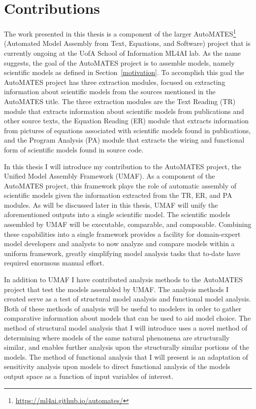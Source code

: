 \section{Contributions\label{sec:contributions}}
The work presented in this thesis is a component of the larger AutoMATES\footnote{\url{https://ml4ai.github.io/automates/}} (Automated Model Assembly from Text, Equations, and Software) project \citep{pyarelal2019} that is currently ongoing at the UofA School of Information ML4AI lab.
As the name suggests, the goal of the AutoMATES project is to assemble models, namely scientific models as defined in Section~\ref{motivation}.
To accomplish this goal the AutoMATES project has three extraction modules, focused on extracting information about scientific models from the sources mentioned in the AutoMATES title.
The three extraction modules are the Text Reading (TR) module that extracts information about scientific models from publications and other source texts, the Equation Reading (ER) module that extracts information from pictures of equations associated with scientific models found in publications, and the Program Analysis (PA) module that extracts the wiring and functional form of scientific models found in source code.

In this thesis I will introduce my contribution to the AutoMATES project, the Unified Model Assembly Framework (UMAF).
As a component of the AutoMATES project, this framework plays the role of automatic assembly of scientific models given the information extracted from the TR, ER, and PA modules.
As will be discussed later in this thesis, UMAF will unify the aforementioned outputs into a single scientific model.
The scientific models assembled by UMAF will be executable, comparable, and composable.
Combining these capabilities into a single framework provides a facility for domain-expert model developers and analysts to now analyze and compare models within a uniform framework, greatly simplifying model analysis tasks that to-date have required enormous manual effort.

In addition to UMAF I have contributed analysis methods to the AutoMATES project that test the models assembled by UMAF.
The analysis methods I created serve as a test of structural model analysis and functional model analysis.
Both of these methods of analysis will be useful to modelers in order to gather comparative information about models that can be used to aid model choice.
The method of structural model analysis that I will introduce uses a novel method of determining where models of the same natural phenomena are structurally similar, and enables further analysis upon the structurally similar portions of the models.
The method of functional analysis that I will present is an adaptation of sensitivity analysis upon models to direct functional analysis of the models output space as a function of input variables of interest.


